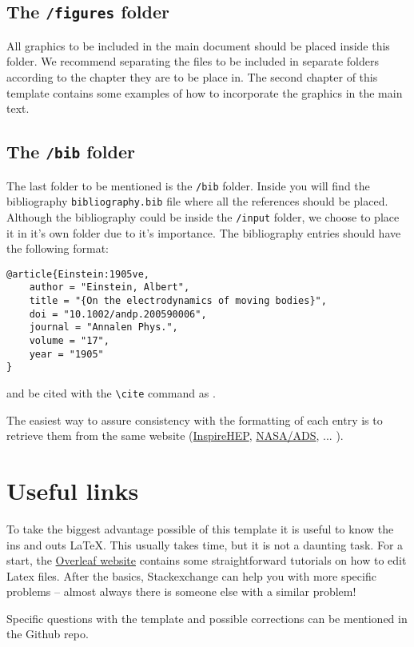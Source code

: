 \subsection{The \texttt{/figures} folder }
%
All graphics to be included in the main document should be placed inside this folder. We recommend separating the files to be included in separate folders according to the chapter they are to be place in. The second chapter of this template contains some examples of how to incorporate the graphics in the main text.

\subsection{The \texttt{/bib} folder }

The last folder to be mentioned is the \texttt{/bib} folder. Inside you will find the bibliography \texttt{bibliography.bib} file where all the references should be placed. Although the bibliography could be inside the \texttt{/input} folder, we choose to place it in it's own folder due to it's importance. The bibliography entries should have the following format:

\begin{verbatim} 	
@article{Einstein:1905ve,
	author = "Einstein, Albert",
	title = "{On the electrodynamics of moving bodies}",
	doi = "10.1002/andp.200590006",
	journal = "Annalen Phys.",
	volume = "17",
	year = "1905"
}
\end{verbatim}
%
and be cited with the \texttt{\textbackslash cite} command as \cite{Einstein:1905ve}.

The easiest way to assure consistency with the formatting of each entry is to retrieve them from the same website (\href{https://inspirehep.net/}{InspireHEP}, \href{https://ui.adsabs.harvard.edu/}{NASA/ADS}, ... ).

\section{Useful links}
%
To take the biggest advantage possible of this template it is useful to know the ins and outs \LaTeX. This usually takes time, but it is not a daunting task. For a start, the \href{https://www.overleaf.com/learn}{Overleaf website} contains some straightforward tutorials on how to edit Latex files. After the basics, Stackexchange can help you with more specific problems -- almost always there is someone else with a similar problem!

Specific questions with the template and possible corrections can be mentioned in the Github repo.

